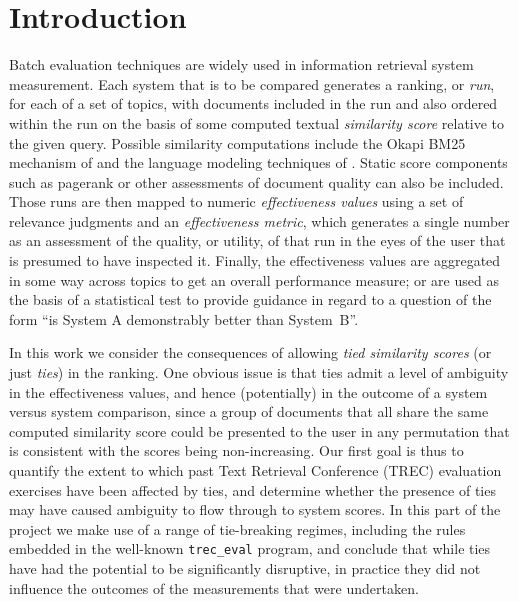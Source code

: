 \section{Introduction}
\label{sec-intro}

Batch evaluation techniques are widely used in information retrieval
system measurement.
Each system that is to be compared generates a ranking, or
{\emph{run}}, for each of a set of topics, with documents included in
the run and also ordered within the run on the basis of some computed
textual {\emph{similarity score}} relative to the given query.
Possible similarity computations include the Okapi BM25 mechanism of
{\citet{rwjhg94trec}} and the language modeling techniques of
{\citet{pc98sigir}}.
Static score components such as pagerank or other assessments of
document quality can also be included.
Those runs are then mapped to numeric {\emph{effectiveness values}}
using a set of relevance judgments and an {\emph{effectiveness
metric}}, which generates a single number as an assessment of the
quality, or utility, of that run in the eyes of the user that is
presumed to have inspected it.
Finally, the effectiveness values are aggregated in some way across
topics to get an overall performance measure; or are used as the
basis of a statistical test to provide guidance in regard to a
question of the form ``is System A demonstrably better than
System~B''.

In this work we consider the consequences of allowing {\emph{tied
similarity scores}} (or just {\emph{ties}}) in the ranking.
One obvious issue is that ties admit a level of ambiguity in the
effectiveness values, and hence (potentially) in the outcome of a
system versus system comparison, since a group of documents that all
share the same computed similarity score could be presented to the
user in any permutation that is consistent with the scores being
non-increasing.
Our first goal is thus to quantify the extent to which past Text
Retrieval Conference (TREC) evaluation exercises have been affected
by ties, and determine whether the presence of ties may have caused
ambiguity to flow through to system scores.
In this part of the project we make use of a range of tie-breaking
regimes, including the rules embedded in the well-known
{\tt{trec\_eval}} program, and conclude that while ties have had the
potential to be significantly disruptive, in practice they did not
influence the outcomes of the measurements that were undertaken.

